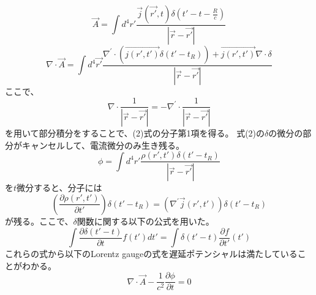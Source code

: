 \documentclass{jarticle}
\title{}
\author{}
\begin{document}
\maketitle

\begin{equation}
\vec{A} = \int d^4r' \frac{\vec{j}(\vec{r'},t)\delta(t'-t-\frac{R}{c})}{|\vec{r}-\vec{r'}|}
\end{equation}
\begin{equation}
\nabla \cdot \vec{A} = \int d^4\vec{r'} \frac{\nabla^\prime\cdot(\vec{j(r',t')}\delta(t'-t_R)) + \vec{j(r',t')}\nabla\cdot\delta}{|\vec{r}-\vec{r'}|}
\end{equation}
ここで、
\begin{equation}
\nabla\cdot\frac{1}{|\vec{r}-\vec{r'}|}=-\nabla^\prime\cdot\frac{1}{|\vec{r}-\vec{r'}|}
\end{equation}
を用いて部分積分をすることで、(2)式の分子第1項を得る。
式(2)の$\delta$の微分の部分がキャンセルして、電流微分のみ生き残る。
\begin{equation}
\phi = \int d^4 r' \frac{\rho(r',t')\delta(t'-t_R)}{|\vec{r}-\vec{r'}|}
\end{equation}
を$t$微分すると、分子には
\begin{equation}
(\frac{\partial \rho(r',t')}{\partial t'})\delta(t'-t_R) =
(\nabla^\prime\vec{j}(r',t'))\delta(t'-t_R)
\end{equation}
が残る。ここで、$\delta$関数に関する以下の公式を用いた。
\begin{equation}
\int \frac{\partial \delta(t'-t)}{\partial t}f(t')dt'=
\int \delta(t'-t)\frac{\partial f}{\partial t'}(t')
\end{equation}
これらの式から以下のLorentz gaugeの式を遅延ポテンシャルは満たしていることがわかる。
\begin{equation}
\nabla\cdot\vec{A} - \frac{1}{c^2}\frac{\partial \phi}{\partial t}=0
\end{equation}
\end{document}
